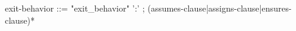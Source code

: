 \begin{syntax}
exit-behavior ::= "exit_behavior" ':' ;
(assumes-clause|assigns-clause|ensures-clause)*
\end{syntax}